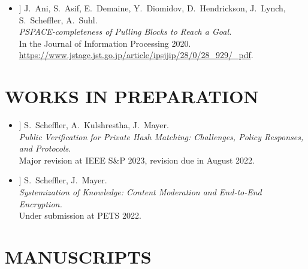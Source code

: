 \documentclass{res}
\begin{document}
\begin{resume}
\newcommand{\pullingblocksJIP}{[9]\xspace}

\begin{itemize}
\item[\pullingblocksJIP] J.~Ani, S.~Asif, E.~Demaine, Y.~Diomidov, D.~Hendrickson, J.~Lynch, S.~Scheffler, A.~Suhl. \\
\emph{PSPACE-completeness of Pulling Blocks to Reach a Goal.} \\
In the Journal of Information Processing 2020.\\
\url{https://www.jstage.jst.go.jp/article/ipsjjip/28/0/28_929/_pdf}.
\end{itemize}

\vspace{0.25in}

\section{WORKS IN PREPARATION}
\vspace{0.25in}

\newcommand{\csamimprovements}{[11]\xspace}
\newcommand{\eeesok}{[12]\xspace}

\begin{itemize}
\item[\csamimprovements] S.~Scheffler, A.~Kulshrestha, J.~Mayer. \\
\emph{Public Verification for Private Hash Matching: Challenges, Policy Responses, and Protocols.} \\
Major revision at IEEE S\&P 2023, revision due in August 2022.

\item[\eeesok] S.~Scheffler, J.~Mayer. \\
\emph{Systemization of Knowledge: Content Moderation and End-to-End Encryption.} \\
Under submission at PETS 2022.


\end{itemize}

\vspace{0.25in}

\section{MANUSCRIPTS}
\vspace{0.25in}


\end{resume}
\end{document}
